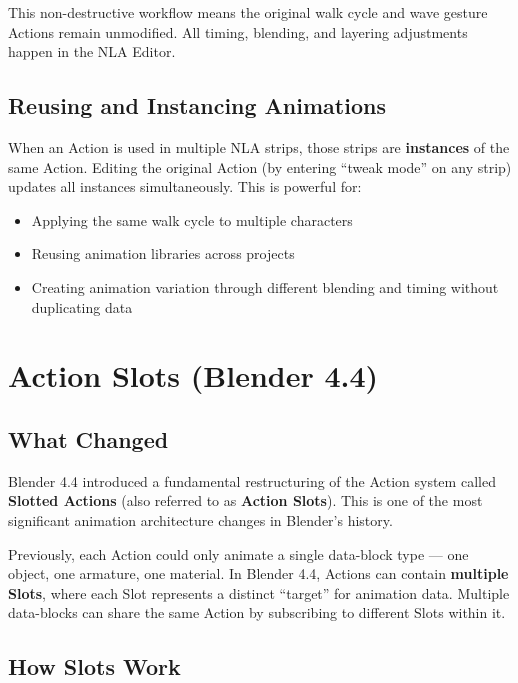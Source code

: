 This non-destructive workflow means the original walk cycle and wave gesture Actions remain unmodified. All timing, blending, and layering adjustments happen in the NLA Editor.

\subsection{Reusing and Instancing Animations}

When an Action is used in multiple NLA strips, those strips are \textbf{instances} of the same Action. Editing the original Action (by entering ``tweak mode'' on any strip) updates all instances simultaneously. This is powerful for:

\begin{itemize}[leftmargin=2em]
  \item Applying the same walk cycle to multiple characters
  \item Reusing animation libraries across projects
  \item Creating animation variation through different blending and timing without duplicating data
\end{itemize}


\section{Action Slots (Blender 4.4)}
\label{sec:action-slots}

\subsection{What Changed}

Blender 4.4 introduced a fundamental restructuring of the Action system called \textbf{Slotted Actions} (also referred to as \textbf{Action Slots}). This is one of the most significant animation architecture changes in Blender's history.

Previously, each Action could only animate a single data-block type --- one object, one armature, one material. In Blender 4.4, Actions can contain \textbf{multiple Slots}, where each Slot represents a distinct ``target'' for animation data. Multiple data-blocks can share the same Action by subscribing to different Slots within it.

\subsection{How Slots Work}

